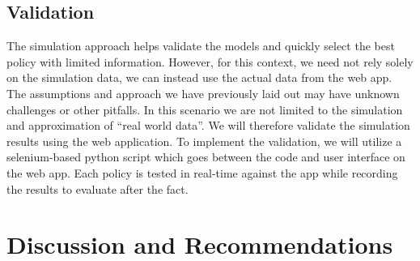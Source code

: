 \documentclass[11pt,a4paper]{article}
\begin{document}
\subsection{Validation}
The simulation approach helps validate the models and quickly select the best policy with limited information. 
However, for this context, we need not rely solely on the simulation data, we can instead use the actual data from the web app. 
The assumptions and approach we have previously laid out may have unknown challenges or other pitfalls. 
In this scenario we are not limited to the simulation and approximation of “real world data”. 
We will therefore validate the simulation results using the web application. 
To implement the validation, we will utilize a selenium-based python script which goes between the code and user interface on the web app. 
Each policy is tested in real-time against the app while recording the results to evaluate after the fact. 

\section{Discussion and Recommendations}

\pagebreak


\end{document}
